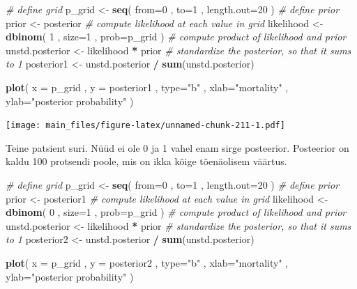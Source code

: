 \documentclass[]{book}
\newenvironment{Shaded}{\begin{snugshade}}{\end{snugshade}}
\newcommand{\KeywordTok}[1]{\textcolor[rgb]{0.13,0.29,0.53}{\textbf{#1}}}
\newcommand{\DataTypeTok}[1]{\textcolor[rgb]{0.13,0.29,0.53}{#1}}
\newcommand{\DecValTok}[1]{\textcolor[rgb]{0.00,0.00,0.81}{#1}}
\newcommand{\StringTok}[1]{\textcolor[rgb]{0.31,0.60,0.02}{#1}}
\newcommand{\CommentTok}[1]{\textcolor[rgb]{0.56,0.35,0.01}{\textit{#1}}}
\newcommand{\OperatorTok}[1]{\textcolor[rgb]{0.81,0.36,0.00}{\textbf{#1}}}
\newcommand{\NormalTok}[1]{#1}
\begin{document}
\begin{Shaded}
\begin{Highlighting}[]
\CommentTok{# define grid}
\NormalTok{p_grid <-}\StringTok{ }\KeywordTok{seq}\NormalTok{( }\DataTypeTok{from=}\DecValTok{0}\NormalTok{ , }\DataTypeTok{to=}\DecValTok{1}\NormalTok{ , }\DataTypeTok{length.out=}\DecValTok{20}\NormalTok{ )}
\CommentTok{# define prior}
\NormalTok{prior <-}\StringTok{ }\NormalTok{posterior}
\CommentTok{# compute likelihood at each value in grid}
\NormalTok{likelihood <-}\StringTok{ }\KeywordTok{dbinom}\NormalTok{( }\DecValTok{1}\NormalTok{ , }\DataTypeTok{size=}\DecValTok{1}\NormalTok{ , }\DataTypeTok{prob=}\NormalTok{p_grid )}
\CommentTok{# compute product of likelihood and prior}
\NormalTok{unstd.posterior <-}\StringTok{ }\NormalTok{likelihood }\OperatorTok{*}\StringTok{ }\NormalTok{prior}
\CommentTok{# standardize the posterior, so that it sums to 1}
\NormalTok{posterior1 <-}\StringTok{ }\NormalTok{unstd.posterior }\OperatorTok{/}\StringTok{ }\KeywordTok{sum}\NormalTok{(unstd.posterior)}

\KeywordTok{plot}\NormalTok{( }\DataTypeTok{x =}\NormalTok{ p_grid , }\DataTypeTok{y =}\NormalTok{ posterior1 , }\DataTypeTok{type=}\StringTok{"b"}\NormalTok{ ,}
    \DataTypeTok{xlab=}\StringTok{"mortality"}\NormalTok{ , }\DataTypeTok{ylab=}\StringTok{"posterior probability"}\NormalTok{ )}
\end{Highlighting}
\end{Shaded}

\texttt{[image: main\_files/figure-latex/unnamed-chunk-211-1.pdf]}

Teine patsient suri. Nüüd ei ole 0 ja 1 vahel enam sirge posteerior.
Posteerior on kaldu 100 protsendi poole, mis on ikka kõige tõenäolisem
väärtus.

\begin{Shaded}
\begin{Highlighting}[]
\CommentTok{# define grid}
\NormalTok{p_grid <-}\StringTok{ }\KeywordTok{seq}\NormalTok{( }\DataTypeTok{from=}\DecValTok{0}\NormalTok{ , }\DataTypeTok{to=}\DecValTok{1}\NormalTok{ , }\DataTypeTok{length.out=}\DecValTok{20}\NormalTok{ )}
\CommentTok{# define prior}
\NormalTok{prior <-}\StringTok{ }\NormalTok{posterior1}
\CommentTok{# compute likelihood at each value in grid}
\NormalTok{likelihood <-}\StringTok{ }\KeywordTok{dbinom}\NormalTok{( }\DecValTok{0}\NormalTok{ , }\DataTypeTok{size=}\DecValTok{1}\NormalTok{ , }\DataTypeTok{prob=}\NormalTok{p_grid )}
\CommentTok{# compute product of likelihood and prior}
\NormalTok{unstd.posterior <-}\StringTok{ }\NormalTok{likelihood }\OperatorTok{*}\StringTok{ }\NormalTok{prior}
\CommentTok{# standardize the posterior, so that it sums to 1}
\NormalTok{posterior2 <-}\StringTok{ }\NormalTok{unstd.posterior }\OperatorTok{/}\StringTok{ }\KeywordTok{sum}\NormalTok{(unstd.posterior)}

\KeywordTok{plot}\NormalTok{( }\DataTypeTok{x =}\NormalTok{ p_grid , }\DataTypeTok{y =}\NormalTok{ posterior2 , }\DataTypeTok{type=}\StringTok{"b"}\NormalTok{ ,}
    \DataTypeTok{xlab=}\StringTok{"mortality"}\NormalTok{ , }\DataTypeTok{ylab=}\StringTok{"posterior probability"}\NormalTok{ )}
\end{Highlighting}
\end{Shaded}
\end{document}
